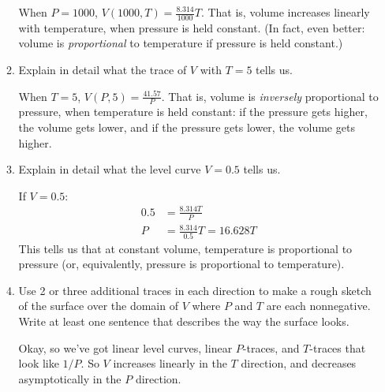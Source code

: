 \begin{enumerate}[leftmargin=0pt]
\begin{enumerate}
        \begin{red}
        When $P = 1000$, $V(1000, T) = \frac{8.314}{1000} T$. That is, volume increases linearly with temperature, when pressure is held constant. (In fact, even better: volume is \textit{proportional} to temperature if pressure is held constant.)
        \end{red}
        \item Explain in detail what the trace of $V$ with $T = 5$ tells us.
        
        \begin{red}
        When $T = 5$, $V(P, 5) = \frac{41.57}{P}$. That is, volume is \textit{inversely} proportional to pressure, when temperature is held constant: if the pressure gets higher, the volume gets lower, and if the pressure gets lower, the volume gets higher.
        \end{red}
        \item Explain in detail what the level curve $V = 0.5$ tells us.
        
        \begin{red}
        If $V = 0.5$:
        \begin{align*}
            0.5 &= \frac{8.314 T}{P}\\
            P &= \frac{8.314}{0.5} T = 16.628 T
        \end{align*}
        This tells us that at constant volume, temperature is proportional to pressure (or, equivalently, pressure is proportional to temperature).
        \end{red}
        \item Use 2 or three additional traces in each direction to make a rough sketch of the surface over the domain of $V$ where $P$ and $T$ are each nonnegative. Write at least one sentence that describes the way the surface looks.
        
        \begin{red}
        Okay, so we've got linear level curves, linear $P$-traces, and $T$-traces that look like $1/P$. So $V$ increases linearly in the $T$ direction, and decreases asymptotically in the $P$ direction.
        

\end{red}
\end{enumerate}
\end{enumerate}
